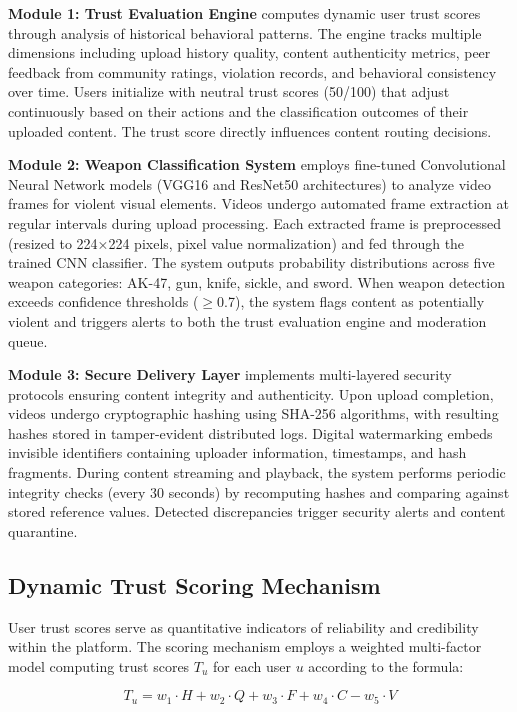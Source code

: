 \documentclass[conference]{IEEEtran}
\begin{document}
\textbf{Module 1: Trust Evaluation Engine} computes dynamic user trust scores through analysis of historical behavioral patterns. The engine tracks multiple dimensions including upload history quality, content authenticity metrics, peer feedback from community ratings, violation records, and behavioral consistency over time. Users initialize with neutral trust scores (50/100) that adjust continuously based on their actions and the classification outcomes of their uploaded content. The trust score directly influences content routing decisions.

\textbf{Module 2: Weapon Classification System} employs fine-tuned Convolutional Neural Network models (VGG16 and ResNet50 architectures) to analyze video frames for violent visual elements. Videos undergo automated frame extraction at regular intervals during upload processing. Each extracted frame is preprocessed (resized to 224×224 pixels, pixel value normalization) and fed through the trained CNN classifier. The system outputs probability distributions across five weapon categories: AK-47, gun, knife, sickle, and sword. When weapon detection exceeds confidence thresholds ($\geq$0.7), the system flags content as potentially violent and triggers alerts to both the trust evaluation engine and moderation queue.

\textbf{Module 3: Secure Delivery Layer} implements multi-layered security protocols ensuring content integrity and authenticity. Upon upload completion, videos undergo cryptographic hashing using SHA-256 algorithms, with resulting hashes stored in tamper-evident distributed logs. Digital watermarking embeds invisible identifiers containing uploader information, timestamps, and hash fragments. During content streaming and playback, the system performs periodic integrity checks (every 30 seconds) by recomputing hashes and comparing against stored reference values. Detected discrepancies trigger security alerts and content quarantine.

\subsection{Dynamic Trust Scoring Mechanism}

User trust scores serve as quantitative indicators of reliability and credibility within the platform. The scoring mechanism employs a weighted multi-factor model computing trust scores $T_u$ for each user $u$ according to the formula:

\begin{equation}
T_u = w_1 \cdot H + w_2 \cdot Q + w_3 \cdot F + w_4 \cdot C - w_5 \cdot V
\end{equation}
\end{document}
